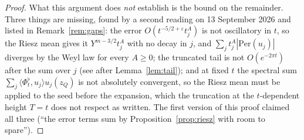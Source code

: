 \documentclass[11pt,a4paper]{article}
\theoremstyle{remark}\newtheorem{remark}[theorem]{Remark}
\begin{document}
\begin{proof}
What this argument does \emph{not} establish is the bound on the remainder. Three things are missing, found by a
second reading on 13 September 2026 and listed in Remark~\ref{rem:gaps}: the error $O(t^{-5/2+\varepsilon}t_j^{A})$ is
not oscillatory in $t$, so the Riesz mean gives it $Y^{m-3/2}t_j^A$ with no decay in $j$, and $\sum_jt_j^A|\mathrm{Per}(u_j)|$
diverges by the Weyl law for every $A\ge0$; the truncated tail is not $O(e^{-2\pi t})$ after the sum over $j$ (see
after Lemma~\ref{lem:tail}); and at fixed $t$ the spectral sum $\sum_j\langle\Phi^\flat_t,u_j\rangle u_j(z_Q)$ is not
absolutely convergent, so the Riesz mean must be applied to the seed before the expansion, which the truncation at
the $t$-dependent height $T=t$ does not respect as written. The first version of this proof claimed all three
(``the error terms sum by Proposition~\ref{prop:riesz} with room to spare'').
\end{proof}
\end{document}
